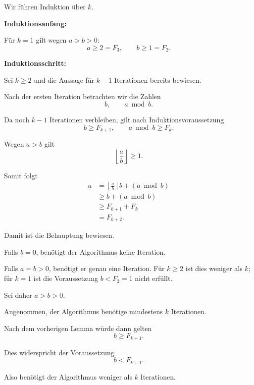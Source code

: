 \begin{myproof}
  Wir führen Induktion über $k$.

  \textbf{Induktionsanfang:}

  Für $k=1$ gilt wegen $a>b>0$:
  \[
    a\ge2=F_3,
    \qquad
    b\ge1=F_2.
  \]

  \textbf{Induktionsschritt:}

  Sei $k\ge2$ und die Aussage für
  $k-1$ Iterationen bereits bewiesen.

  Nach der ersten Iteration betrachten
  wir die Zahlen
  \[
    b,\qquad a\bmod b.
  \]

  Da noch $k-1$ Iterationen verbleiben,
  gilt nach Induktionsvoraussetzung
  \[
    b\ge F_{k+1},
    \qquad
    a\bmod b\ge F_k.
  \]

  Wegen $a>b$ gilt
  \[
    \left\lfloor\frac ab\right\rfloor\ge1.
  \]

  Somit folgt
  \begin{align*}
    a
    &=\left\lfloor\frac ab\right\rfloor b
      +(a\bmod b)\\
    &\ge b+(a\bmod b)\\
    &\ge F_{k+1}+F_k\\
    &=F_{k+2}.
  \end{align*}

  Damit ist die Behauptung bewiesen.
\end{myproof}



\begin{myproof}
  Falls $b=0$, benötigt der Algorithmus
  keine Iteration.

  Falls $a=b>0$, benötigt er genau eine
  Iteration. Für $k\ge2$ ist dies weniger
  als $k$; für $k=1$ ist die Voraussetzung
  $b<F_2=1$ nicht erfüllt.

  Sei daher $a>b>0$.

  Angenommen, der Algorithmus benötige
  mindestens $k$ Iterationen.

  Nach dem vorherigen Lemma würde dann
  gelten
  \[
    b\ge F_{k+1}.
  \]

  Dies widerspricht der Voraussetzung
  \[
    b<F_{k+1}.
  \]

  Also benötigt der Algorithmus weniger
  als $k$ Iterationen.
\end{myproof}


